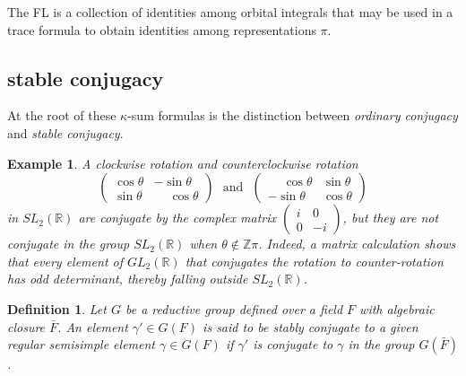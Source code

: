 \documentclass[brochure,english,12pt]{bourbaki}
\newtheorem{example}[equation]{Example}
\newtheorem{definition}[equation]{Definition}
\newcommand{\ring}[1]{\mathbb{#1}}
\begin{document}
The FL is a collection of identities among orbital integrals that may be used in a trace formula to
obtain identities among representations $\pi$.

\subsection{stable conjugacy}\label{sec:stable}

At the root of these $\kappa$-sum formulas is the distinction between
{\it ordinary conjugacy} and {\it stable conjugacy}.  
\begin{example}
A clockwise rotation and counterclockwise rotation
\[
\begin{pmatrix}\cos\theta &-\sin\theta\\\sin\theta &\phantom{-}\cos\theta\end{pmatrix}
\text{~~and~~}
\begin{pmatrix}\phantom{-}\cos\theta &\sin\theta\\-\sin\theta &\cos\theta\end{pmatrix}
\]
in $SL_2(\ring{R})$ are conjugate by the complex matrix $\begin{pmatrix}i&0\\0&-i\end{pmatrix}$, 
but they are not conjugate
in the group $SL_2(\ring{R})$ when $\theta\not\in\ring{Z}\pi$.  Indeed,
a matrix calculation shows
that every element of $GL_2(\ring{R})$ that conjugates the rotation to
counter-rotation has odd determinant, thereby falling outside $SL_2(\ring{R})$.
\end{example}

\begin{definition} Let $G$ be a reductive group defined over a field
  $F$ with algebraic closure $\bar F$.  An element
  $\gamma'\in G(F)$ is said to be {\it stably conjugate} to a given regular
  semisimple element $\gamma\in G(F)$ if $\gamma'$ is conjugate to $\gamma$ in
  the group $G(\bar F)$.
\end{definition}

\end{document}
